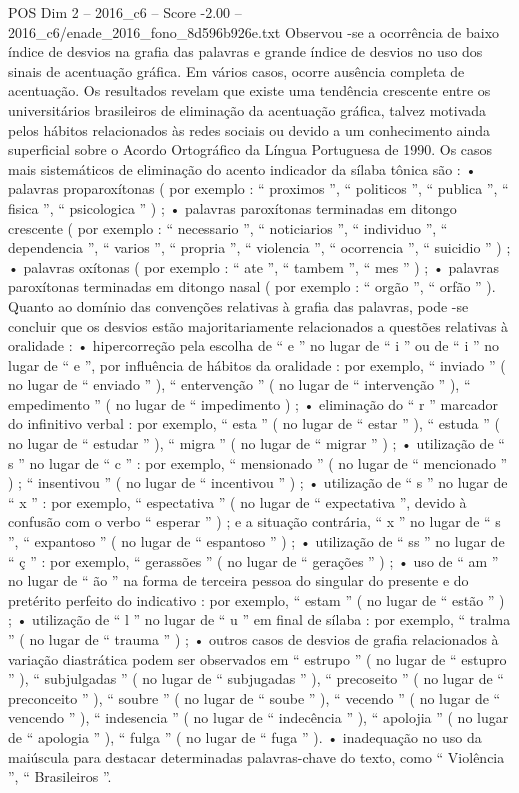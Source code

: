 \begin{textsample}{POS Dim 2 – 2016\_c6 – Score -2.00 – 2016\_c6/enade\_2016\_fono\_8d596b926e.txt}
Observou -se a ocorrência de baixo índice de desvios na grafia das palavras e grande índice de desvios no uso dos sinais de acentuação gráfica.
Em vários casos, ocorre ausência completa de acentuação.
Os resultados revelam que existe uma tendência crescente entre os universitários brasileiros de eliminação da acentuação gráfica, talvez motivada pelos hábitos relacionados às redes sociais ou devido a um conhecimento ainda superficial sobre o Acordo Ortográfico da Língua Portuguesa de 1990.
Os casos mais sistemáticos de eliminação do acento indicador da sílaba tônica são : • palavras proparoxítonas ( por exemplo : “ proximos ”, “ politicos ”, “ publica ”, “ fisica ”, “ psicologica ” ) ; • palavras paroxítonas terminadas em ditongo crescente ( por exemplo : “ necessario ”, “ noticiarios ”, “ individuo ”, “ dependencia ”, “ varios ”, “ propria ”, “ violencia ”, “ ocorrencia ”, “ suicidio ” ) ; • palavras oxítonas ( por exemplo : “ ate ”, “ tambem ”, “ mes ” ) ; • palavras paroxítonas terminadas em ditongo nasal ( por exemplo : “ orgão ”, “ orfão ” ).
Quanto ao domínio das convenções relativas à grafia das palavras, pode -se concluir que os desvios estão majoritariamente relacionados a questões relativas à oralidade : • hipercorreção pela escolha de “ e ” no lugar de “ i ” ou de “ i ” no lugar de “ e ”, por influência de hábitos da oralidade : por exemplo, “ inviado ” ( no lugar de “ enviado ” ), “ entervenção ” ( no lugar de “ intervenção ” ), “ empedimento ” ( no lugar de “ impedimento ) ; • eliminação do “ r ” marcador do infinitivo verbal : por exemplo, “ esta ” ( no lugar de “ estar ” ), “ estuda ” ( no lugar de “ estudar ” ), “ migra ” ( no lugar de “ migrar ” ) ; • utilização de “ s ” no lugar de “ c ” : por exemplo, “ mensionado ” ( no lugar de “ mencionado ” ) ; “ insentivou ” ( no lugar de “ incentivou ” ) ; • utilização de “ s ” no lugar de “ x ” : por exemplo, “ espectativa ” ( no lugar de “ expectativa ”, devido à confusão com o verbo “ esperar ” ) ; e a situação contrária, “ x ” no lugar de “ s ”, “ expantoso ” ( no lugar de “ espantoso ” ) ; • utilização de “ ss ” no lugar de “ ç ” : por exemplo, “ gerassões ” ( no lugar de “ gerações ” ) ; • uso de “ am ” no lugar de “ ão ” na forma de terceira pessoa do singular do presente e do pretérito perfeito do indicativo : por exemplo, “ estam ” ( no lugar de “ estão ” ) ; • utilização de “ l ” no lugar de “ u ” em final de sílaba : por exemplo, “ tralma ” ( no lugar de “ trauma ” ) ; • outros casos de desvios de grafia relacionados à variação diastrática podem ser observados em “ estrupo ” ( no lugar de “ estupro ” ), “ subjulgadas ” ( no lugar de “ subjugadas ” ), “ precoseito ” ( no lugar de “ preconceito ” ), “ soubre ” ( no lugar de “ soube ” ), “ vecendo ” ( no lugar de “ vencendo ” ), “ indesencia ” ( no lugar de “ indecência ” ), “ apolojia ” ( no lugar de “ apologia ” ), “ fulga ” ( no lugar de “ fuga ” ). • inadequação no uso da maiúscula para destacar determinadas palavras-chave do texto, como “ Violência ”, “ Brasileiros ”.

\end{textsample}
